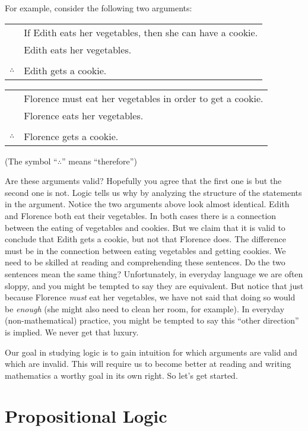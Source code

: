 \documentclass[10pt,]{book}
\theoremstyle{plain}
\theoremstyle{definition}
\theoremstyle{definition}
\theoremstyle{definition}
\numberwithin{equation}{chapter}
\newcommand{\hrulethin}  {\noalign{\hrule height 0.04em}}
\begin{document}
For example, consider the following two arguments:
%
\begin{tabular}{ll}
&If Edith eats her vegetables, then she can have a cookie.\tabularnewline[0pt]
&Edith eats her vegetables.\tabularnewline[0pt]
&\tabularnewline\hrulethin
\(\therefore\)&Edith gets a cookie.
\end{tabular}
\begin{tabular}{ll}
&Florence must eat her vegetables in order to get a cookie.\tabularnewline[0pt]
&Florence eats her vegetables.\tabularnewline[0pt]
&\tabularnewline\hrulethin
\(\therefore\)&Florence gets a cookie.
\end{tabular}
\par

(The symbol ``\(\therefore\)\index{\(\therefore\)}'' means ``therefore'')
%
\par

Are these arguments valid? Hopefully you agree that the first one is but the second one is not. Logic tells us why by analyzing the structure of the statements in the argument. Notice the two arguments above look almost identical. Edith and Florence both eat their vegetables. In both cases there is a connection between the eating of vegetables and cookies. But we claim that it is valid to conclude that Edith gets a cookie, but not that Florence does. The difference must be in the connection between eating vegetables and getting cookies. We need to be skilled at reading and comprehending these sentences. Do the two sentences mean the same thing? Unfortunately, in everyday language we are often sloppy, and you might be tempted to say they are equivalent. But notice that just because Florence \emph{must} eat her vegetables, we have not said that doing so would be \emph{enough} (she might also need to clean her room, for example). In everyday (non-mathematical) practice, you might be tempted to
say this ``other direction'' is implied. We never get that luxury.
%
\par

Our goal in studying logic is to gain intuition for which arguments are valid and which are invalid. This will require us to become better at reading and writing mathematics \textendash{} a worthy goal in its own right. So let's get started.
%
\typeout{************************************************}
\typeout{************************************************}
\section[Propositional Logic]{Propositional Logic}\label{sec_propositional}
\end{document}
